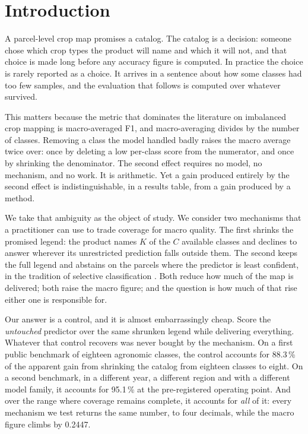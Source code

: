 \section{Introduction}
\label{sec:introduction}

A parcel-level crop map promises a catalog. The catalog is a decision: someone chose which crop
types the product will name and which it will not, and that choice is made long before any
accuracy figure is computed. In practice the choice is rarely reported as a choice. It arrives in a
sentence about how some classes had too few samples, and the evaluation that follows is computed
over whatever survived.

This matters because the metric that dominates the literature on imbalanced crop mapping is
macro-averaged F1, and macro-averaging divides by the number of classes. Removing a class the model
handled badly raises the macro average twice over: once by deleting a low per-class score from the
numerator, and once by shrinking the denominator. The second effect requires no model, no
mechanism, and no work. It is arithmetic. Yet a gain produced entirely by the second effect is
indistinguishable, in a results table, from a gain produced by a method.

We take that ambiguity as the object of study. We consider two mechanisms that a practitioner can
use to trade coverage for macro quality. The first shrinks the promised legend: the product names
$K$ of the $C$ available classes and declines to answer wherever its unrestricted prediction falls
outside them. The second keeps the full legend and abstains on the parcels where the predictor is
least confident, in the tradition of selective classification
\cite{chow1970reject,geifman2017selective}. Both reduce how much of the map is delivered; both
raise the macro figure;
and the question is how much of that rise either one is responsible for.

Our answer is a control, and it is almost embarrassingly cheap. Score the \emph{untouched}
predictor over the same shrunken legend while delivering everything. Whatever that control
recovers was never bought by the mechanism. On a first public benchmark of eighteen agronomic
classes, the control accounts for \num{88.3}\,\% of the apparent gain from shrinking the catalog
from eighteen classes to eight. On a second benchmark, in a different year, a different region and
with a different model family, it accounts for \num{95.1}\,\% at the pre-registered operating
point. And over the range where coverage remains complete, it accounts for \emph{all} of it: every
mechanism we test returns the same number, to four decimals, while the macro figure climbs by
\num{0.2447}.

